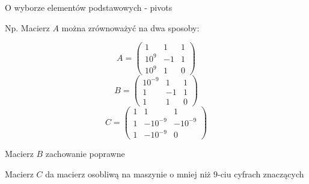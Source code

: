 \begin{frame}{ O wyborze elementów podstawowych - pivots}

Np. Macierz $A$ można zrównoważyć na dwa sposoby:

$$A=\left(\begin{array}{lll}
1 & 1 & 1\\
10^{9} & -1 & 1\\
10^{9} & 1 & 0
\end{array}\right)
$$
$$
B=\left(\begin{array}{lll}
10^{-9} & 1 & 1\\
1 & -1 & 1\\
1 & 1 & 0
\end{array}\right)
$$
$$
C=\left(\begin{array}{lll}
1 & 1 & 1\\
1 & -10^{-9} & -10^{-9}\\
1 & -10^{-9} & 0
\end{array}\right)
$$

Macierz $B$ zachowanie poprawne

Macierz $C$ da macierz osobliwą na maszynie o mniej niż $ 9$-ciu cyfrach znaczących

\end{frame}

